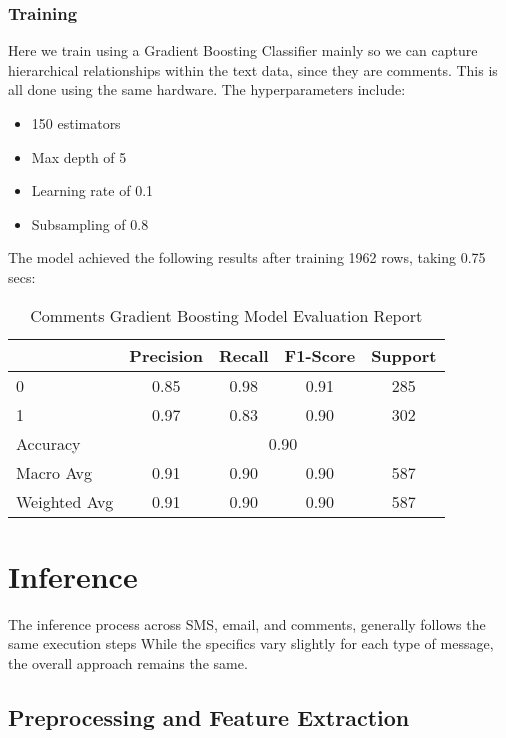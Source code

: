 \documentclass{article}
\begin{document}
\subsubsection*{Training}

Here we train using a Gradient Boosting Classifier mainly so we can capture hierarchical relationships within the text data, since they are comments. This is all done using the same hardware. The hyperparameters include:

\begin{itemize}
    \item 150 estimators
    \item Max depth of 5
    \item Learning rate of 0.1
    \item Subsampling of 0.8
\end{itemize}

The model achieved the following results after training 1962 rows, taking 0.75 secs:

\begin{table}[htbp]
    \centering
    \caption{Comments Gradient Boosting Model Evaluation Report}
    \begin{tabular}{l c c c c}
    \toprule
     & Precision & Recall & F1-Score & Support \\
    \midrule
    0 & 0.85 & 0.98 & 0.91 & 285 \\
    1 & 0.97 & 0.83 & 0.90 & 302 \\
    \midrule
    Accuracy & \multicolumn{4}{c}{0.90} \\
    Macro Avg & 0.91 & 0.90 & 0.90 & 587 \\
    Weighted Avg & 0.91 & 0.90 & 0.90 & 587 \\
    \bottomrule
    \end{tabular}
    \label{tab:gradient_boosting_evaluation}
\end{table}

\section{Inference}

The inference process across SMS, email, and comments, generally follows the same execution steps While the specifics vary slightly for each type of message, the overall approach remains the same.


\subsection{Preprocessing and Feature Extraction}
\end{document}
